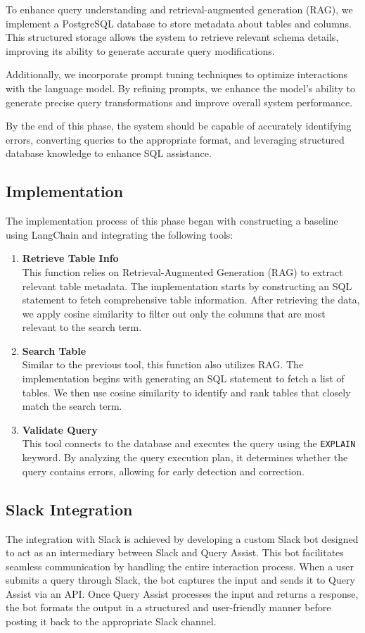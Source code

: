     To enhance query understanding and retrieval-augmented generation (RAG), we implement a PostgreSQL database to store metadata about tables and columns. This structured storage allows the system to retrieve relevant schema details, improving its ability to generate accurate query modifications.

    Additionally, we incorporate prompt tuning techniques to optimize interactions with the language model. By refining prompts, we enhance the model's ability to generate precise query transformations and improve overall system performance.

    By the end of this phase, the system should be capable of accurately identifying errors, converting queries to the appropriate format, and leveraging structured database knowledge to enhance SQL assistance.
    \subsection{Implementation}
    The implementation process of this phase began with constructing a baseline using LangChain and integrating the following tools:

    \begin{enumerate}
        \item \textbf{Retrieve Table Info} \\
        This function relies on Retrieval-Augmented Generation (RAG) to extract relevant table metadata. The implementation starts by constructing an SQL statement to fetch comprehensive table information. After retrieving the data, we apply cosine similarity to filter out only the columns that are most relevant to the search term.

        \item \textbf{Search Table} \\
        Similar to the previous tool, this function also utilizes RAG. The implementation begins with generating an SQL statement to fetch a list of tables. We then use cosine similarity to identify and rank tables that closely match the search term.

        \item \textbf{Validate Query} \\
        This tool connects to the database and executes the query using the \texttt{EXPLAIN} keyword. By analyzing the query execution plan, it determines whether the query contains errors, allowing for early detection and correction.
    \end{enumerate}
    \subsection{Slack Integration}
    The integration with Slack is achieved by developing a custom Slack bot designed to act as an intermediary between Slack and Query Assist. This bot facilitates seamless communication by handling the entire interaction process. When a user submits a query through Slack, the bot captures the input and sends it to Query Assist via an API. Once Query Assist processes the input and returns a response, the bot formats the output in a structured and user-friendly manner before posting it back to the appropriate Slack channel.

